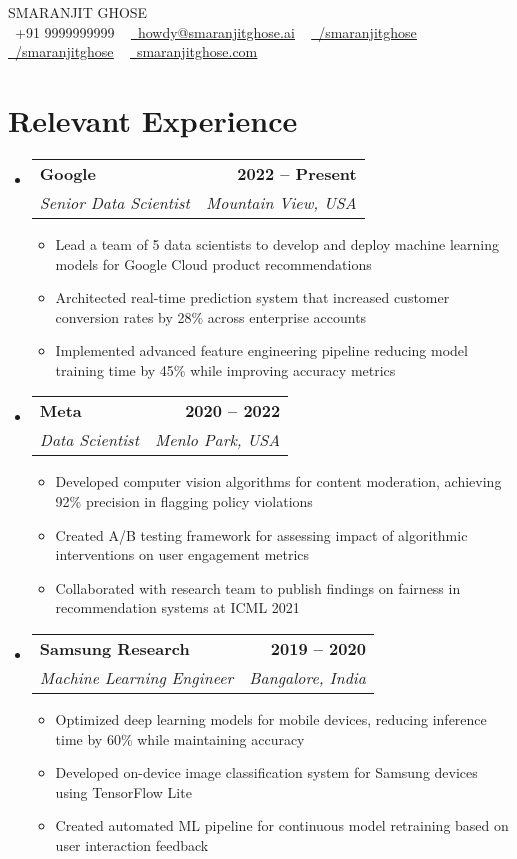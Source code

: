\documentclass[letterpaper,11pt]{article}
\makeatletter
\newcommand{\resumeItem}[1]{
  \item\small{
    {#1 \vspace{-2pt}}
  }
}
\newcommand{\resumeSubheading}[4]{
  \vspace{-2pt}\item
    \begin{tabular*}{1.0\textwidth}[t]{l@{\extracolsep{\fill}}r}
      \textbf{#1} & \textbf{\small\color{datecolor} #2} \\
      \textit{\small#3} & \textit{\small #4} \\
    \end{tabular*}\vspace{-7pt}
}
\newcommand{\resumeSubHeadingListStart}{\begin{itemize}[leftmargin=0.0in, label={}]}
\newcommand{\resumeSubHeadingListEnd}{\end{itemize}}
\newcommand{\resumeItemListStart}{\begin{itemize}}
\newcommand{\resumeItemListEnd}{\end{itemize}\vspace{-5pt}}
\makeatother
\begin{document}
\begin{center}
    {\Huge \scshape \textcolor{maincolor}{SMARANJIT GHOSE}} \\ \vspace{10pt}
    \small 
    \raisebox{-0.1\height}\faPhone\ \textcolor{subheadingcolor}{+91 9999999999} ~ 
    \href{mailto:howdy@smaranjitghose.ai}{\raisebox{-0.2\height}\faEnvelope\  \textcolor{subheadingcolor}{\underline{howdy@smaranjitghose.ai}}} ~ 
    \href{https://linkedin.com/in/smaranjitghose/}{\raisebox{-0.2\height}\faLinkedin\ \textcolor{subheadingcolor}{\underline{/smaranjitghose}}}  ~
    \href{https://github.com/smaranjitghose}{\raisebox{-0.2\height}\faGithub\ \textcolor{subheadingcolor}{\underline{/smaranjitghose}}}  ~
    \href{https://smaranjitghose.com}{\raisebox{-0.2\height}\faGlobe\ \textcolor{subheadingcolor}{\underline{smaranjitghose.com}}}
\end{center}
\vspace{-14pt}



\section{Relevant Experience}
\resumeSubHeadingListStart
\resumeSubheading
  {Google}{2022 -- Present}
  {Senior Data Scientist}{Mountain View, USA}
  \resumeItemListStart
    \resumeItem{Lead a team of 5 data scientists to develop and deploy machine learning models for Google Cloud product recommendations}
    \resumeItem{Architected real-time prediction system that increased customer conversion rates by 28\% across enterprise accounts}
    \resumeItem{Implemented advanced feature engineering pipeline reducing model training time by 45\% while improving accuracy metrics}
  \resumeItemListEnd

\resumeSubheading
  {Meta}{2020 -- 2022}
  {Data Scientist}{Menlo Park, USA}
  \resumeItemListStart
    \resumeItem{Developed computer vision algorithms for content moderation, achieving 92\% precision in flagging policy violations}
    \resumeItem{Created A/B testing framework for assessing impact of algorithmic interventions on user engagement metrics}
    \resumeItem{Collaborated with research team to publish findings on fairness in recommendation systems at ICML 2021}
  \resumeItemListEnd

\resumeSubheading
  {Samsung Research}{2019 -- 2020}
  {Machine Learning Engineer}{Bangalore, India}
  \resumeItemListStart
    \resumeItem{Optimized deep learning models for mobile devices, reducing inference time by 60\% while maintaining accuracy}
    \resumeItem{Developed on-device image classification system for Samsung devices using TensorFlow Lite}
    \resumeItem{Created automated ML pipeline for continuous model retraining based on user interaction feedback}
  \resumeItemListEnd
\resumeSubHeadingListEnd
\end{document}
